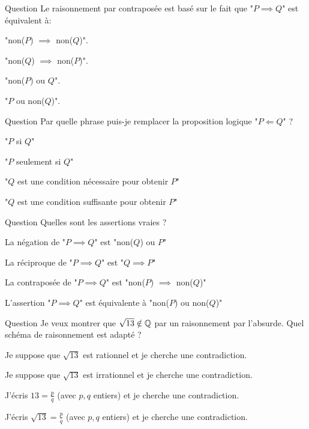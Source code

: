 \begin{multi}[multiple,feedback=
{La contraposée de "\(P \implies Q\)" est "non(\(Q\)) \(\implies\) non(\(P\))".
}]{Question}
Le raisonnement par contraposée est basé
sur le fait que "\(P \implies Q\)" est équivalent à:

    \item "non(\(P\)) \(\implies\) non(\(Q\))".
    \item* "non(\(Q\)) \(\implies\) non(\(P\))".
    \item "non(\(P\)) ou \(Q\)".
    \item "\(P\) ou non(\(Q\))".
\end{multi}


\begin{multi}[multiple,feedback=
{C'est plus facile si on comprend que "\(P \Longleftarrow Q\)", c'est "\(Q \implies P\)", autrement dit "si \(Q\) est vraie, alors \(P\) est vraie".
}]{Question}
Par quelle phrase puis-je remplacer la proposition logique "\(P \Longleftarrow Q\)" ?

    \item* "\(P\) si \(Q\)"
    \item "\(P\) seulement si \(Q\)"
    \item "\(Q\) est une condition nécessaire pour obtenir \(P\)"
    \item* "\(Q\) est une condition suffisante pour obtenir \(P\)"
\end{multi}


\begin{multi}[multiple,feedback=
{Il faut revenir à la définition de "\(P \implies Q\)" qui est "non(\(P\)) ou \(Q\)".
}]{Question}
Quelles sont les assertions vraies ?

    \item La négation de "\(P \implies Q\)" est "non(\(Q\)) ou \(P\)"
    \item* La réciproque de "\(P \implies Q\)" est "\(Q \implies P\)"
    \item La contraposée de "\(P \implies Q\)" est "non(\(P\)) \(\implies\) non(\(Q\))"
    \item L'assertion "\(P \implies Q\)" est équivalente à "non(\(P\)) ou non(\(Q\))"
\end{multi}


\begin{multi}[multiple,feedback=
{Par l'absurde on suppose que \(\sqrt{13} \in \Qq\), c'est-à-dire que c'est un nombre rationnel, autrement dit qu'il s'écrit \(\frac{p}{q}\), avec \(p\), \(q\) entiers. Voir la preuve que \(\sqrt{2} \notin \Qq\).
}]{Question}
Je veux montrer que \(\sqrt{13} \notin \mathbb{Q}\) par un raisonnement par l'absurde. Quel schéma de raisonnement est adapté ?

    \item* Je suppose que \(\sqrt{13}\) est rationnel et je cherche une contradiction.
    \item Je suppose que \(\sqrt{13}\) est irrationnel et je cherche une contradiction.
    \item J'écris \(13 = \frac{p}{q}\) (avec \(p,q\) entiers) et je cherche une contradiction.
    \item* J'écris \(\sqrt{13} = \frac{p}{q}\) (avec \(p,q\) entiers) et je cherche une contradiction.
\end{multi}
